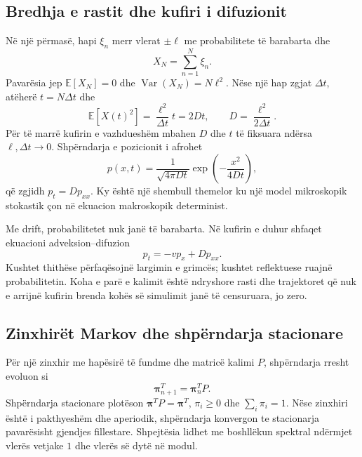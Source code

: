 \documentclass[11pt,oneside,openany]{book}
\newcommand{\vect}[1]{\bm{#1}}
\newcommand{\E}{\mathbb{E}}
\newcommand{\Var}{\operatorname{Var}}
\begin{document}


\subsection{Bredhja e rastit dhe kufiri i difuzionit}
Në një përmasë, hapi $\xi_n$ merr vlerat $\pm\ell$ me probabilitete të barabarta dhe
\begin{equation}
 X_N=\sum_{n=1}^{N}\xi_n.
\end{equation}
Pavarësia jep $\E[X_N]=0$ dhe $\Var(X_N)=N\ell^2$. Nëse një hap zgjat $\Delta t$, atëherë $t=N\Delta t$ dhe
\begin{equation}
 \E[X(t)^2]=\frac{\ell^2}{\Delta t}t=2Dt,
 \qquad D=\frac{\ell^2}{2\Delta t}.
\end{equation}
Për të marrë kufirin e vazhdueshëm mbahen $D$ dhe $t$ të fiksuara ndërsa $\ell,\Delta t\to0$. Shpërndarja e pozicionit i afrohet
\begin{equation}
 p(x,t)=\frac{1}{\sqrt{4\pi Dt}}\exp\left(-\frac{x^2}{4Dt}\right),
\end{equation}
që zgjidh $p_t=Dp_{xx}$. Ky është një shembull themelor ku një model mikroskopik stokastik çon në ekuacion makroskopik determinist.

Me drift, probabilitetet nuk janë të barabarta. Në kufirin e duhur shfaqet ekuacioni adveksion--difuzion
\begin{equation}
 p_t=-v p_x+Dp_{xx}.
\end{equation}
Kushtet thithëse përfaqësojnë largimin e grimcës; kushtet reflektuese ruajnë probabilitetin. Koha e parë e kalimit është ndryshore rasti dhe trajektoret që nuk e arrijnë kufirin brenda kohës së simulimit janë të censuruara, jo zero.

\subsection{Zinxhirët Markov dhe shpërndarja stacionare}
Për një zinxhir me hapësirë të fundme dhe matricë kalimi $P$, shpërndarja rresht evoluon si
\begin{equation}
 \vect\pi_{n+1}^T=\vect\pi_n^TP.
\end{equation}
Shpërndarja stacionare plotëson $\vect\pi^TP=\vect\pi^T$, $\pi_i\ge0$ dhe $\sum_i\pi_i=1$. Nëse zinxhiri është i pakthyeshëm dhe aperiodik, shpërndarja konvergon te stacionarja pavarësisht gjendjes fillestare. Shpejtësia lidhet me boshllëkun spektral ndërmjet vlerës vetjake $1$ dhe vlerës së dytë në modul.
\end{document}
